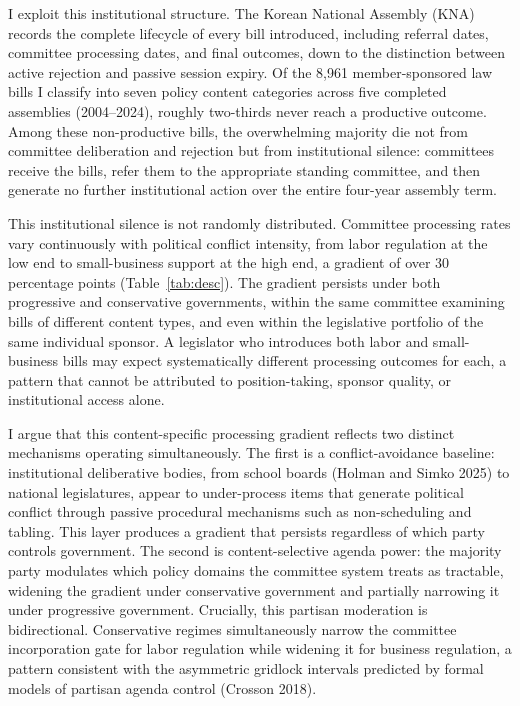 \documentclass[11pt]{article}
\begin{document}
I exploit this institutional structure. The Korean National Assembly (KNA) records the complete lifecycle of every bill introduced, including referral dates, committee processing dates, and final outcomes, down to the distinction between active rejection and passive session expiry. Of the 8,961 member-sponsored law bills I classify into seven policy content categories across five completed assemblies (2004--2024), roughly two-thirds never reach a productive outcome. Among these non-productive bills, the overwhelming majority die not from committee deliberation and rejection but from institutional silence: committees receive the bills, refer them to the appropriate standing committee, and then generate no further institutional action over the entire four-year assembly term.

This institutional silence is not randomly distributed. Committee processing rates vary continuously with political conflict intensity, from labor regulation at the low end to small-business support at the high end, a gradient of over 30 percentage points (Table~\ref{tab:desc}). The gradient persists under both progressive and conservative governments, within the same committee examining bills of different content types, and even within the legislative portfolio of the same individual sponsor. A legislator who introduces both labor and small-business bills may expect systematically different processing outcomes for each, a pattern that cannot be attributed to position-taking, sponsor quality, or institutional access alone.

I argue that this content-specific processing gradient reflects two distinct mechanisms operating simultaneously. The first is a conflict-avoidance baseline: institutional deliberative bodies, from school boards (Holman and Simko 2025) to national legislatures, appear to under-process items that generate political conflict through passive procedural mechanisms such as non-scheduling and tabling. This layer produces a gradient that persists regardless of which party controls government. The second is content-selective agenda power: the majority party modulates which policy domains the committee system treats as tractable, widening the gradient under conservative government and partially narrowing it under progressive government. Crucially, this partisan moderation is bidirectional. Conservative regimes simultaneously narrow the committee incorporation gate for labor regulation while widening it for business regulation, a pattern consistent with the asymmetric gridlock intervals predicted by formal models of partisan agenda control (Crosson 2018).
\end{document}
